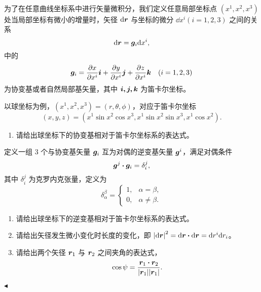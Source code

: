 \documentclass[11pt]{article}
\newenvironment{question}[2][Question]{\begin{trivlist}
\item[\hskip \labelsep {\bfseries #1}\hskip \labelsep {\bfseries #2.}]}{\hfill$\blacktriangleleft$\end{trivlist}}
\begin{document}
        
    \begin{question}{4 (16') (度量张量)}~
    
    为了在任意曲线坐标系中进行矢量微积分，我们定义任意局部坐标点 $(x^1, x^2, x^3)$ 处当局部坐标有微小的增量时，矢径 $\dd \vb*{r}$ 与坐标的微分 $\dd x^i (i = 1, 2, 3)$ 之间的关系
    \[ \dd \vb*{r} = \vb*{g}_i \dd x^i, \]
    中的
    \[ \vb*{g}_i = \pdv{x}{x^i} \vb*{i} + \pdv{y}{x^i} \vb*{j} + \pdv{z}{x^i} \vb*{k} \quad (i = 1, 2, 3) \]
    为协变基或者自然局部基矢量，其中 $\vb*{i, j, k}$ 为笛卡尔坐标。
    
    以球坐标为例，$(x^1, x^2, x^3) = (r, \theta, \phi)$，对应于笛卡尔坐标
    \[ (x, y, z) = (x^1 \sin x^2 \cos x^3, x^1 \sin x^2 \sin x^3, x^1 \cos x^2). \]
    
    \begin{enumerate}
        \item [a (4')] 请给出球坐标下的协变基相对于笛卡尔坐标系的表达式。
    \end{enumerate}
    
    定义一组 3 个与协变基矢量 $\vb*{g}_i$ 互为对偶的逆变基矢量 $\vb*{g}^i$，满足对偶条件
    \[ \vb*{g}^j \vdot \vb*{g}_i = \delta^j_i, \]
    其中 $\delta^j_i$ 为克罗内克张量，定义为
    \begin{equation*}
        \delta^\beta_\alpha = \begin{cases}
        1, & \alpha = \beta, \\
        0, & \alpha \neq \beta.
        \end{cases}
    \end{equation*}
    
    \begin{enumerate}
        \item [b (4')] 请给出球坐标下的逆变基相对于笛卡尔坐标系的表达式。
        \item [c (4')] 请给出矢径发生微小变化时长度的变化，即 $\abs{\dd \vb*{r}}^2 = \dd \vb*{r} \vdot \dd \vb*{r} = \dd r^i \dd r_i$。
        \item [d (4')] 请给出两个矢径 $\vb*{r}_1$ 与 $\vb*{r}_2$ 之间夹角的表达式，
        \[ \cos \psi = \frac{\vb*{r}_1 \vdot \vb*{r}_2}{\abs{\vb*{r}_1}\abs{\vb*{r}_1}}. \]
    \end{enumerate}
    \end{question}
\end{document}
